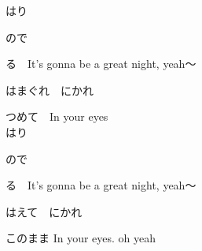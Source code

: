 {はり

ので

る　It's gonna be a great night, yeah～

はまぐれ　にかれ

つめて　In your eyes
\\

はり

ので

る　It's gonna be a great night, yeah～

はえて　にかれ

このまま In your eyes. oh yeah
\\

}